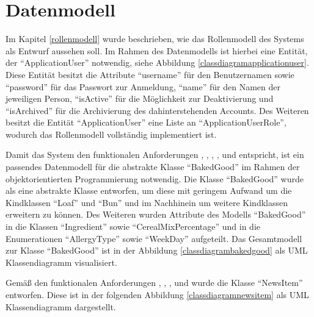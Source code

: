 
\clearpage

\section{Datenmodell} \label{datenmodell}
Im Kapitel \ref{rollenmodell} wurde beschrieben, wie das Rollenmodell des Systems als Entwurf aussehen soll.
Im Rahmen des Datenmodells ist hierbei eine Entität, der \enquote{ApplicationUser} notwendig, siehe Abbildung \ref{classdiagramapplicationuser}. Diese Entität besitzt die Attribute \enquote{username} für den Benutzernamen sowie \enquote{password} für das Passwort zur Anmeldung, \enquote{name} für den Namen der jeweiligen Person, \enquote{isActive} für die Möglichkeit zur Deaktivierung und \enquote{isArchived} für die Archivierung des dahinterstehenden Accounts. Des Weiteren besitzt die Entität \enquote{ApplicationUser} eine Liste an \enquote{ApplicationUserRole}, wodurch das Rollenmodell vollständig implementiert ist.


Damit das System den funktionalen Anforderungen , , , ,  und  entspricht, ist ein passendes Datenmodell für die abstrakte Klasse \enquote{BakedGood} im Rahmen der objektorientierten Programmierung notwendig. Die Klasse \enquote{BakedGood} wurde als eine abstrakte Klasse  entworfen, um diese mit geringem Aufwand um die Kindklassen \enquote{Loaf} und \enquote{Bun} und im Nachhinein um weitere Kindklassen erweitern zu können. Des Weiteren wurden Attribute des Modells \enquote{BakedGood} in die Klassen \enquote{Ingredient} sowie \enquote{CerealMixPercentage} und in die Enumerationen \enquote{AllergyType} sowie \enquote{WeekDay} aufgeteilt. Das  Gesamtmodell zur Klasse \enquote{BakedGood} ist in der Abbildung \ref{classdiagrambakedgood} als UML Klassendiagramm visualisiert.



\newpage

Gemäß den funktionalen Anforderungen , , , und  wurde die Klasse \enquote{NewsItem} entworfen. Diese ist in der folgenden Abbildung \ref{classdiagramnewsitem} als UML Klassendiagramm dargestellt.

